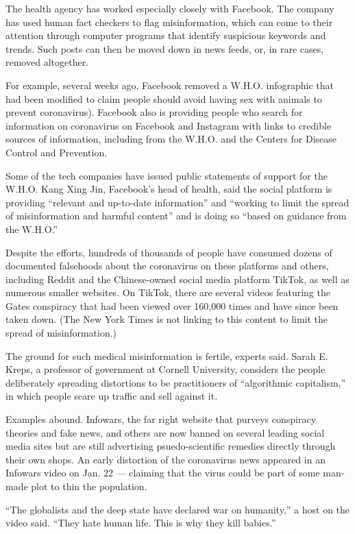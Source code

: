 The health agency has worked especially closely with Facebook. The
company has used human fact checkers to flag misinformation, which can
come to their attention through computer programs that identify
suspicious keywords and trends. Such posts can then be moved down in
news feeds, or, in rare cases, removed altogether.

For example, several weeks ago, Facebook removed a W.H.O. infographic
that had been modified to claim people should avoid having sex with
animals to prevent coronavirus). Facebook also is providing people who
search for information on coronavirus on Facebook and Instagram with
links to credible sources of information, including from the W.H.O. and
the Centers for Disease Control and Prevention.

Some of the tech companies have issued public statements of support for
the W.H.O. Kang Xing Jin, Facebook's head of health, said the social
platform is providing ``relevant and up-to-date information'' and
``working to limit the spread of misinformation and harmful content''
and is doing so ``based on guidance from the W.H.O.''

Despite the efforts, hundreds of thousands of people have consumed
dozens of documented falsehoods about the coronavirus on these platforms
and others, including Reddit and the Chinese-owned social media platform
TikTok, as well as numerous smaller websites. On TikTok, there are
several videos featuring the Gates conspiracy that had been viewed over
160,000 times and have since been taken down. (The New York Times is not
linking to this content to limit the spread of misinformation.)

The ground for such medical misinformation is fertile, experts said.
Sarah E. Kreps, a professor of government at Cornell University,
considers the people deliberately spreading distortions to be
practitioners of ``algorithmic capitalism,'' in which people scare up
traffic and sell against it.

Examples abound. Infowars, the far right website that purveys conspiracy
theories and fake news, and others are now banned on several leading
social media sites but are still advertising psuedo-scientific remedies
directly through their own shops. An early distortion of the coronavirus
news appeared in an Infowars video on Jan. 22 --- claiming that the
virus could be part of some man-made plot to thin the population.

``The globalists and the deep state have declared war on humanity,'' a
host on the video said. ``They hate human life. This is why they kill
babies.''

